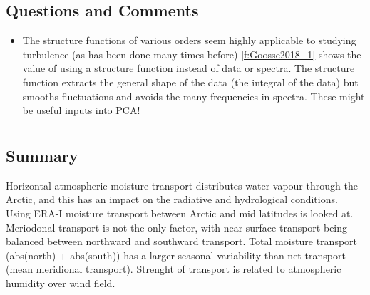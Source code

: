 \documentclass{article}
\begin{document}
\subsection*{Questions and Comments}
\begin{itemize}
\item The structure functions of various orders seem highly applicable to studying turbulence (as has been done many times before) \cref{f:Goosse2018_1} shows the value of using a structure function instead of data or spectra. 
The structure function extracts the general shape of the data (the integral of the data) but smooths fluctuations and avoids the many frequencies in spectra. These might be useful inputs into PCA!
\end{itemize}
\newpage
\clearpage
\newpage
\clearpage




\def \sect {naakka2019}
\section{\citeauthor{\sect} \citeyear{\sect}}
\textbf{\citefield{\sect}{title}\nocite{\sect}}
\subsection*{Summary}
Horizontal atmospheric moisture transport distributes water vapour through the Arctic, and this has an impact on the radiative and hydrological conditions. Using ERA-I moisture transport between Arctic and mid latitudes is looked at. Meriodonal transport is not the only factor, with near surface transport being balanced between northward and southward transport. Total moisture transport (abs(north) + abs(south)) has a larger seasonal variability than net transport (mean meridional transport). Strenght of transport is related to atmospheric humidity over wind field. 
\end{document}
